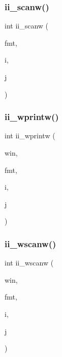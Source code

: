 \mbox{\label{C-macros_8c_a13c589c66da48838bef7ced902997126}} 
\subsubsection{\texorpdfstring{ii\+\_\+scanw()}{ii\_scanw()}}
{\footnotesize\ttfamily int ii\+\_\+scanw (\begin{DoxyParamCaption}\item[{char $\ast$}]{fmt,  }\item[{int $\ast$}]{i,  }\item[{int $\ast$}]{j }\end{DoxyParamCaption})}

\mbox{\label{C-macros_8c_ab8f1d3103aca01f9fdbbf7017ecf968b}} 
\subsubsection{\texorpdfstring{ii\+\_\+wprintw()}{ii\_wprintw()}}
{\footnotesize\ttfamily int ii\+\_\+wprintw (\begin{DoxyParamCaption}\item[{W\+I\+N\+D\+OW $\ast$}]{win,  }\item[{const char $\ast$}]{fmt,  }\item[{int}]{i,  }\item[{int}]{j }\end{DoxyParamCaption})}

\mbox{\label{C-macros_8c_a4cca36c361fd3bcc48fdb5d0b723d765}} 
\subsubsection{\texorpdfstring{ii\+\_\+wscanw()}{ii\_wscanw()}}
{\footnotesize\ttfamily int ii\+\_\+wscanw (\begin{DoxyParamCaption}\item[{W\+I\+N\+D\+OW $\ast$}]{win,  }\item[{char $\ast$}]{fmt,  }\item[{int $\ast$}]{i,  }\item[{int $\ast$}]{j }\end{DoxyParamCaption})}


